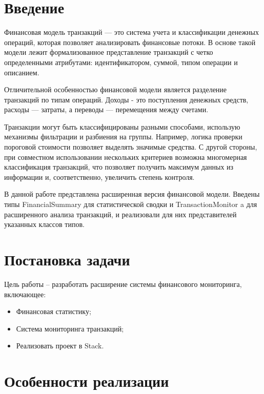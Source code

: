 \documentclass[a4paper, final]{article}
\begin{document}
	\newpage
	
	\tableofcontents
	
	\newpage
	\section*{Введение}
	
	Финансовая модель транзакций — это система учета и классификации денежных операций, которая позволяет анализировать финансовые потоки. В основе такой модели лежит формализованное представление транзакций с четко определенными атрибутами: идентификатором, суммой, типом операции и описанием.
	
	Отличительной особенностью финансовой модели  является разделение транзакций по типам операций. Доходы - это поступления денежных средств, расходы — затраты, а переводы — перемещения между счетами. 
	
	Транзакции могут быть классифицированы разными способами, использую механизмы фильтрации и разбиения на группы. Например, логика проверки пороговой стоимости позволяет выделять значимые средства. С другой стороны, при совместном использовании нескольких критериев возможна многомерная классификация транзакций, что позволяет получить максимум данных из информации и, соответственно, увеличить степень контроля.
	
	В данной работе представлена расширенная версия финансовой модели. Введены типы FinancialSummary для статистической сводки и TransactionMonitor a для расширенного анализа транзакций, и реализовали для них представителей указанных классов типов. 
	
	
	
	\newpage
	\section*{Постановка задачи}
	\par Цель работы -- разработать расширение системы финансового мониторинга, включающее:
	\begin{itemize}
		\item Финансовая статистику;
		\item Система мониторинга транзакций;
		\item Реализовать проект в Stack.
	\end{itemize}
	
	
	\newpage
	\section{Особенности реализации}
	
\end{document}
